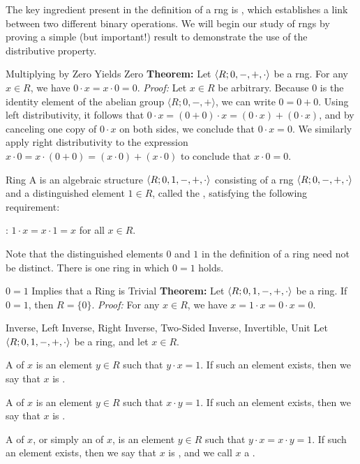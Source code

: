 \documentclass[12pt]{report}
\begin{document}
The key ingredient present in the definition of a rng is , which establishes a link between two different binary operations. We will begin our study of rngs by proving a simple (but important!) result to demonstrate the use of the distributive property.

\begin{thmbox}{Multiplying by Zero Yields Zero}
	\textbf{Theorem:} Let ${\langle {R; 0, -, +, \cdot} \rangle}$ be a rng. For any $x \in R$, we have $0 \cdot x = x \cdot 0 = 0$.
\tcblower
	\textit{Proof:} Let $x \in R$ be arbitrary. Because $0$ is the identity element of the abelian group $\langle R; 0, -, + \rangle$, we can write $0 = 0 + 0$. Using left distributivity, it follows that $0 \cdot x = (0 + 0) \cdot x = (0 \cdot x) + (0 \cdot x)$, and by canceling one copy of $0 \cdot x$ on both sides, we conclude that $0 \cdot x = 0$. We similarly apply right distributivity to the expression $x \cdot 0 = x \cdot (0 + 0) = (x \cdot 0) + (x \cdot 0)$ to conclude that $x \cdot 0 = 0$.
\end{thmbox}

\begin{dfnbox}{Ring}
	A  is an algebraic structure ${\langle {R; 0, 1, -, +, \cdot} \rangle}$ consisting of a rng ${\langle {R; 0, -, +, \cdot} \rangle}$ and a distinguished element $1 \in R$, called the , satisfying the following requirement:
	\begin{dfnitems}
		\item {}: $1 \cdot x = x \cdot 1 = x$ for all $x \in R$.
	\end{dfnitems}
\end{dfnbox}

Note that the distinguished elements $0$ and $1$ in the definition of a ring need not be distinct. There is one ring in which $0 = 1$ holds.

\begin{thmbox}{$0=1$ Implies that a Ring is Trivial}
	\textbf{Theorem:} Let ${\langle {R; 0, 1, -, +, \cdot} \rangle}$ be a ring. If $0 = 1$, then $R = \{0\}$.
\tcblower
	\textit{Proof:} For any $x \in R$, we have $x = 1 \cdot x = 0 \cdot x = 0$.
\end{thmbox}

\begin{dfnbox}{Inverse, Left Inverse, Right Inverse, Two-Sided Inverse, Invertible, Unit}
	Let ${\langle {R; 0, 1, -, +, \cdot} \rangle}$ be a ring, and let $x \in R$.
	\begin{dfnitems}
		\item A  of $x$ is an element $y \in R$ such that $y \cdot x = 1$. If such an element exists, then we say that $x$ is \dfntxt{left-invertible}.
		\item A  of $x$ is an element $y \in R$ such that $x \cdot y = 1$. If such an element exists, then we say that $x$ is \dfntxt{right-invertible}.
		\item A  of $x$, or simply an  of $x$, is an element $y \in R$ such that $y \cdot x = x \cdot y = 1$. If such an element exists, then we say that $x$ is , and we call $x$ a \dfntxt{unit}.
	\end{dfnitems}
\end{dfnbox}
\end{document}
